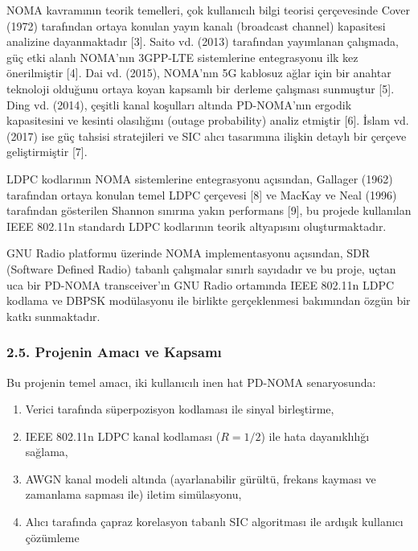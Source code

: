 \documentclass[
]{IEEEtran}
\providecommand{\tightlist}{%
  \setlength{\itemsep}{0pt}\setlength{\parskip}{0pt}}
\begin{document}
\begin{longtable}[]
NOMA kavramının teorik temelleri, çok kullanıcılı bilgi teorisi
çerçevesinde Cover (1972) tarafından ortaya konulan yayın kanalı
(broadcast channel) kapasitesi analizine dayanmaktadır {[}3{]}. Saito
vd. (2013) tarafından yayımlanan çalışmada, güç etki alanlı NOMA'nın
3GPP-LTE sistemlerine entegrasyonu ilk kez önerilmiştir {[}4{]}. Dai vd.
(2015), NOMA'nın 5G kablosuz ağlar için bir anahtar teknoloji olduğunu
ortaya koyan kapsamlı bir derleme çalışması sunmuştur {[}5{]}. Ding vd.
(2014), çeşitli kanal koşulları altında PD-NOMA'nın ergodik kapasitesini
ve kesinti olasılığını (outage probability) analiz etmiştir {[}6{]}.
İslam vd. (2017) ise güç tahsisi stratejileri ve SIC alıcı tasarımına
ilişkin detaylı bir çerçeve geliştirmiştir {[}7{]}.

LDPC kodlarının NOMA sistemlerine entegrasyonu açısından, Gallager
(1962) tarafından ortaya konulan temel LDPC çerçevesi {[}8{]} ve MacKay
ve Neal (1996) tarafından gösterilen Shannon sınırına yakın performans
{[}9{]}, bu projede kullanılan IEEE 802.11n standardı LDPC kodlarının
teorik altyapısını oluşturmaktadır.

GNU Radio platformu üzerinde NOMA implementasyonu açısından, SDR
(Software Defined Radio) tabanlı çalışmalar sınırlı sayıdadır ve bu
proje, uçtan uca bir PD-NOMA transceiver'ın GNU Radio ortamında IEEE
802.11n LDPC kodlama ve DBPSK modülasyonu ile birlikte gerçeklenmesi
bakımından özgün bir katkı sunmaktadır.

\subsubsection{2.5. Projenin Amacı ve
Kapsamı}\label{projenin-amacux131-ve-kapsamux131}

Bu projenin temel amacı, iki kullanıcılı inen hat PD-NOMA senaryosunda:

\begin{enumerate}
\def\labelenumi{\arabic{enumi}.}
\tightlist
\item
  Verici tarafında süperpozisyon kodlaması ile sinyal birleştirme,
\item
  IEEE 802.11n LDPC kanal kodlaması (\(R = 1/2\)) ile hata dayanıklılığı
  sağlama,
\item
  AWGN kanal modeli altında (ayarlanabilir gürültü, frekans kayması ve
  zamanlama sapması ile) iletim simülasyonu,
\item
  Alıcı tarafında çapraz korelasyon tabanlı SIC algoritması ile ardışık
  kullanıcı çözümleme
\end{enumerate}


\end{longtable}
\end{document}
